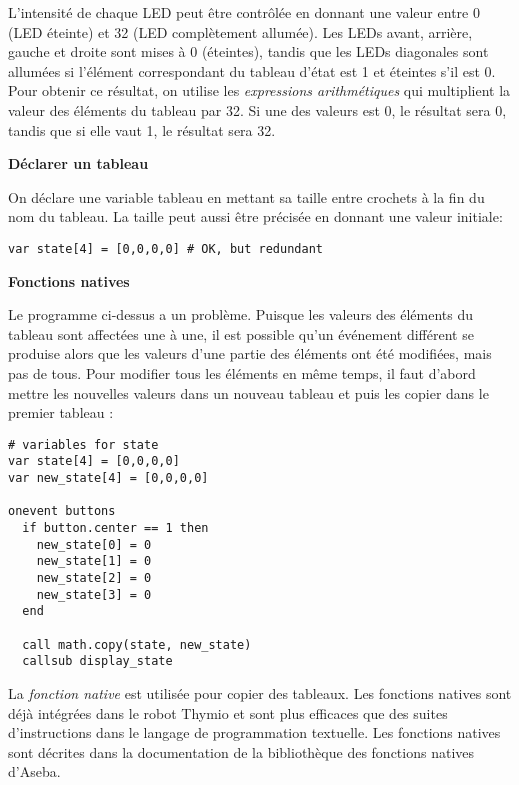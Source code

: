 L'intensité de chaque LED peut être contrôlée en donnant une valeur entre 0 (LED éteinte)
et 32 (LED complètement allumée).
Les LEDs avant, arrière, gauche et droite sont mises à 0 (éteintes), tandis que les LEDs diagonales
sont allumées si l'élément correspondant du tableau d'état est 1
et éteintes s'il est 0.
Pour obtenir ce résultat, on utilise les \emph{expressions arithmétiques} 
qui multiplient la valeur des éléments du tableau par 32.
Si une des valeurs est 0, le résultat sera 0, tandis que si elle vaut 1, le résultat sera 32.

\textbf{\large Déclarer un tableau}

On déclare une variable tableau en mettant sa taille entre crochets à la fin du nom du tableau.
La taille peut aussi être précisée en donnant une valeur initiale:

\begin{footnotesize}
\begin{verbatim}
var state[4] = [0,0,0,0] # OK, but redundant
\end{verbatim}
\end{footnotesize}

\textbf{\large Fonctions natives}

Le programme ci-dessus a un problème.
Puisque les valeurs des éléments du tableau  sont affectées une à une,
il est possible qu'un événement différent se produise
alors que les valeurs d'une partie des éléments ont été modifiées, mais pas de tous.
Pour modifier tous les éléments en même temps, il faut d'abord mettre les nouvelles valeurs
dans un nouveau tableau  et puis les copier dans le premier tableau :

\begin{footnotesize}
\begin{verbatim}
# variables for state
var state[4] = [0,0,0,0]
var new_state[4] = [0,0,0,0]

onevent buttons
  if button.center == 1 then
    new_state[0] = 0
    new_state[1] = 0
    new_state[2] = 0
    new_state[3] = 0
  end
  
  call math.copy(state, new_state)
  callsub display_state
\end{verbatim}
\end{footnotesize}

La \emph{fonction native}  est utilisée pour copier des tableaux.
Les fonctions natives sont déjà intégrées dans le robot Thymio et sont plus efficaces
que des suites d'instructions dans le langage de programmation textuelle.
Les fonctions natives sont décrites dans la documentation de la bibliothèque des fonctions
natives d'Aseba.

